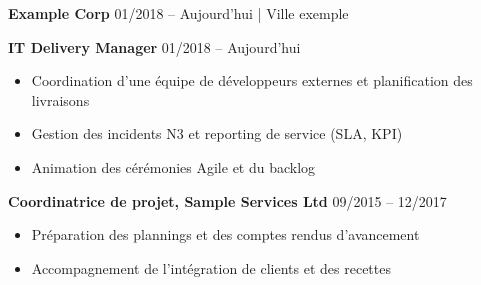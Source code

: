 
\begin{cvparagraph}

\textbf{Example Corp} \hfill 01/2018 -- Aujourd'hui | Ville exemple

\vspace{2mm}

{\large \textbf{IT Delivery Manager}} \hfill 01/2018 -- Aujourd'hui

\vspace{1mm}

\begin{itemize}
\setlength{\itemsep}{0pt}
\setlength{\parskip}{0pt}
    \item Coordination d'une équipe de développeurs externes et planification des livraisons
    \item Gestion des incidents N3 et reporting de service (SLA, KPI)
    \item Animation des cérémonies Agile et du backlog
\end{itemize}

\vspace{1mm}

{\large \textbf{Coordinatrice de projet, Sample Services Ltd}} \hfill 09/2015 -- 12/2017

\vspace{1mm}

\begin{itemize}
\setlength{\itemsep}{0pt}
\setlength{\parskip}{0pt}
    \item Préparation des plannings et des comptes rendus d'avancement
    \item Accompagnement de l'intégration de clients et des recettes
\end{itemize}

\end{cvparagraph}
